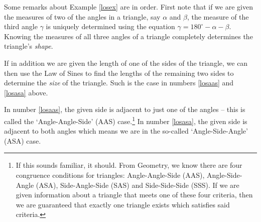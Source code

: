 \documentclass{ximera}
\begin{document}
\begin{example}
\begin{explanation}
\begin{enumerate}
\begin{image}
\end{image}

\end{enumerate}
\end{explanation}
\end{example}

Some remarks about Example \ref{losex} are in order. First note that if we are given the measures of two of the angles in a triangle, say $\alpha$ and $\beta$, the measure of the third angle $\gamma$ is uniquely determined using the equation  $\gamma = 180^{\circ} - \alpha - \beta$.  Knowing the measures of all three angles of a triangle completely determines the triangle's  \textit{shape}.

 

 If in addition we are given the length of one of the sides of the triangle, we can then use the Law of Sines to find the lengths of the remaining two sides to determine the \textit{size} of the triangle. Such is the case in numbers \ref{losaas} and \ref{losasa} above. 
 
  
 
In number \ref{losaas}, the given side is adjacent to just one of the angles -- this is called the `Angle-Angle-Side' (AAS) case.\footnote{If this sounds familiar, it should.  From Geometry, we know there are four congruence conditions for triangles:  Angle-Angle-Side (AAS), Angle-Side-Angle (ASA), Side-Angle-Side (SAS) and Side-Side-Side (SSS).  If we are given information about a triangle that meets one of these four criteria, then we are guaranteed that exactly one triangle exists which satisfies said criteria.}  In number \ref{losasa}, the given side is adjacent to both angles which means we are in the so-called `Angle-Side-Angle' (ASA) case.
\end{document}
